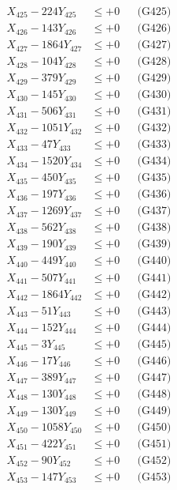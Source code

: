 \documentclass[a4paper,10pt]{article}
\begin{document}
{\begin{align}
X_{425} - 224Y_{425} &\leq +0 && \text{(G425)} \\
X_{426} - 143Y_{426} &\leq +0 && \text{(G426)} \\
X_{427} - 1864Y_{427} &\leq +0 && \text{(G427)} \\
X_{428} - 104Y_{428} &\leq +0 && \text{(G428)} \\
X_{429} - 379Y_{429} &\leq +0 && \text{(G429)} \\
X_{430} - 145Y_{430} &\leq +0 && \text{(G430)} \\
\allowbreak
X_{431} - 506Y_{431} &\leq +0 && \text{(G431)} \\
X_{432} - 1051Y_{432} &\leq +0 && \text{(G432)} \\
X_{433} - 47Y_{433} &\leq +0 && \text{(G433)} \\
X_{434} - 1520Y_{434} &\leq +0 && \text{(G434)} \\
X_{435} - 450Y_{435} &\leq +0 && \text{(G435)} \\
X_{436} - 197Y_{436} &\leq +0 && \text{(G436)} \\
X_{437} - 1269Y_{437} &\leq +0 && \text{(G437)} \\
X_{438} - 562Y_{438} &\leq +0 && \text{(G438)} \\
X_{439} - 190Y_{439} &\leq +0 && \text{(G439)} \\
X_{440} - 449Y_{440} &\leq +0 && \text{(G440)} \\
\allowbreak
X_{441} - 507Y_{441} &\leq +0 && \text{(G441)} \\
X_{442} - 1864Y_{442} &\leq +0 && \text{(G442)} \\
X_{443} - 51Y_{443} &\leq +0 && \text{(G443)} \\
X_{444} - 152Y_{444} &\leq +0 && \text{(G444)} \\
X_{445} - 3Y_{445} &\leq +0 && \text{(G445)} \\
X_{446} - 17Y_{446} &\leq +0 && \text{(G446)} \\
X_{447} - 389Y_{447} &\leq +0 && \text{(G447)} \\
X_{448} - 130Y_{448} &\leq +0 && \text{(G448)} \\
X_{449} - 130Y_{449} &\leq +0 && \text{(G449)} \\
X_{450} - 1058Y_{450} &\leq +0 && \text{(G450)} \\
\allowbreak
X_{451} - 422Y_{451} &\leq +0 && \text{(G451)} \\
X_{452} - 90Y_{452} &\leq +0 && \text{(G452)} \\
X_{453} - 147Y_{453} &\leq +0 && \text{(G453)} \\

\end{align}}
\end{document}
